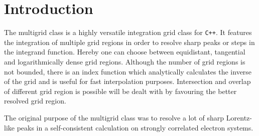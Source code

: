 \chapter{Introduction}

The multigrid class is a highly versatile integration grid class for \texttt{C++}. It features the integration of multiple grid regions in order to resolve sharp peaks or steps in the integrand function. Hereby one can choose between equidistant, tangential and logarithmically dense grid regions. Although the number of grid regions is not bounded, there is an index function which analytically calculates the inverse of the grid and is useful for fast interpolation purposes. Intersection and overlap of different grid region is possible will be dealt with by favouring the better resolved grid region.

The original purpose of the multigrid class was to resolve a lot of sharp Lorentz-like peaks in a self-consistent calculation on strongly correlated electron systems.

